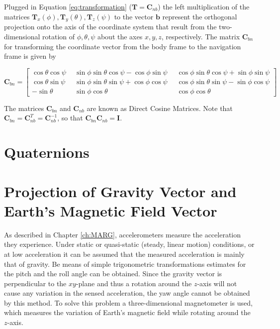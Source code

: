\noindent
Plugged in Equation \ref{eq:transformation} ($\mathbf{T} = \mathbf{C}_{nb}$) the left multiplication of the matrices $\mathbf{T}_x(\phi), \mathbf{T}_y(\theta), \mathbf{T}_z(\psi)$ to the vector $\mathbf{b}$ represent the orthogonal projection onto the axis of the coordinate system that result from the two-dimensional rotation of $\phi, \theta, \psi$ about the axes $x, y, z$, respectively. The matrix $\mathbf{C}_{bn}$ for transforming the coordinate vector from the body frame to the navigation frame is given by

\begin{equation}
\mathbf{C}_{bn} = {\left[\begin{smallmatrix}
   \cos \theta \cos \psi \; &
    \sin \phi \sin \theta \cos \psi - \cos \phi \sin \psi \; &
    \cos \phi \sin \theta \cos \psi + \sin \phi \sin \psi \\
    \cos \theta \sin \psi \;\; &
    \sin \phi \sin \theta \sin \psi + \cos \phi \cos \psi \;\; &
    \cos \phi \sin \theta \sin \psi - \sin \phi \cos \psi \\
    -\sin \theta \;\; &
    \sin \phi \cos \theta \;\; &
    \cos \phi \cos \theta
  \end{smallmatrix}\right]}
\end{equation}

\noindent
The matrices $\mathbf{C}_{bn}$ and $\mathbf{C}_{nb}$ are known as Direct Cosine Matrices. Note that $\mathbf{C}_{bn} = \mathbf{C}^T_{nb} = \mathbf{C}^{-1}_{nb}$, so that $\mathbf{C}^{ }_{bn} \mathbf{C}_{nb} = \mathbf{I}$.  

\section{Quaternions}

\section{Projection of Gravity Vector and Earth's Magnetic Field Vector}

As described in Chapter \ref{ch:MARG}, accelerometers measure the acceleration they experience. Under static or quasi-static (steady, linear motion) conditions, or at low acceleration it can be assumed that the measured acceleration is mainly that of gravity. Be means of simple trigonometric transformations estimates for the pitch and the roll angle can be obtained. Since the gravity vector is perpendicular to the $xy$-plane and thus a rotation around the $z$-axis will not cause any variation in the sensed acceleration, the yaw angle cannot be obtained by this method. To solve this problem a three-dimensional magnetometer is used, which measures the variation of Earth's magnetic field while rotating around the $z$-axis.

